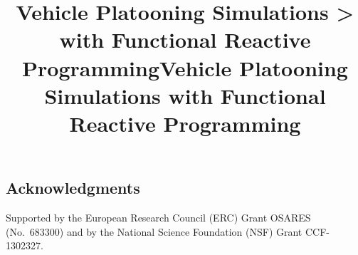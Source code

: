 \documentclass[sigconf]{acmart}
\begin{document}

\setcounter{footnote}{1}
\def\mynewline{\ifnum\value{footnote} > \value{x} \\ \fi}
\title{Vehicle Platooning Simulations \mynewline with Functional Reactive Programming}
\maketitle

\title{Vehicle Platooning Simulations with Functional Reactive Programming}







\subsection*{Acknowledgments} 
Supported by the European Research Council (ERC) Grant OSARES (No.\ 683300) and 
 by the National Science Foundation (NSF) Grant CCF-1302327.


 
\end{document}
